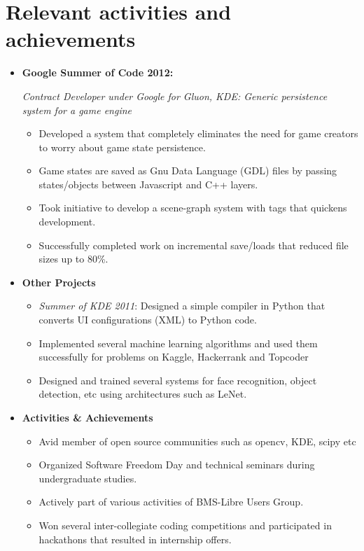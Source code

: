 \documentclass[10pt,letterpaper,sans]{moderncv}        %
\begin{document}
\section{Relevant activities and achievements}
\begin{itemize}
\item \textbf{Google Summer of Code 2012:}
\small{
\textit{Contract Developer under Google for Gluon, KDE: Generic persistence system for a game engine}
\begin{itemize}
\item Developed a system that completely eliminates the need for game creators to worry about game state persistence.
\item Game states are saved as Gnu Data Language (GDL) files by passing states/objects between Javascript and C++ layers.
\item Took initiative to develop a scene-graph system with tags that quickens development.
\item Successfully completed work on incremental save/loads that reduced file sizes up to 80\%.
\end{itemize}
}
\item \textbf{Other Projects}
\begin{small}
\begin{itemize}
\item \textit{Summer of KDE 2011}: Designed a simple compiler in Python that converts UI configurations (XML) to Python code.
\item Implemented several machine learning algorithms and used them successfully for problems on Kaggle, Hackerrank and Topcoder
\item Designed and trained several systems for face recognition, object detection, etc using architectures such as LeNet.
\end{itemize}
\end{small}
\item \textbf{Activities \& Achievements}
\begin{small}
\begin{itemize}
\item Avid member of open source communities such as opencv, KDE, scipy etc
\item Organized Software Freedom Day and technical seminars during undergraduate studies.
\item Actively part of various activities of BMS-Libre Users Group.
\item Won several inter-collegiate coding competitions and participated in hackathons that resulted in internship offers.
\end{itemize}
\end{small}
\end{itemize}
\end{document}
